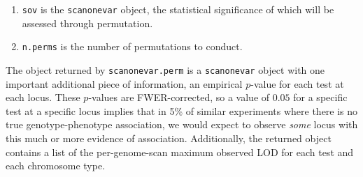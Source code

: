 \documentclass[9pt,twocolumn,twoside]{gsag3jnl}
\begin{document}
\begin{enumerate}
	\item \texttt{sov} is the \texttt{scanonevar} object, the statistical significance of which will be assessed through permutation.
	\item \texttt{n.perms} is the number of permutations to conduct.
\end{enumerate}

The object returned by \texttt{scanonevar.perm} is a \texttt{scanonevar} object with one important additional piece of information, an empirical $p$-value for each test at each locus.
These $p$-values are FWER-corrected, so a value of $0.05$ for a specific test at a specific locus implies that in 5\% of similar experiments where there is no true genotype-phenotype association, we would expect to observe \textit{some} locus with this much or more evidence of association.
Additionally, the returned object contains a list of the per-genome-scan maximum observed LOD for each test and each chromosome type.
\end{document}
